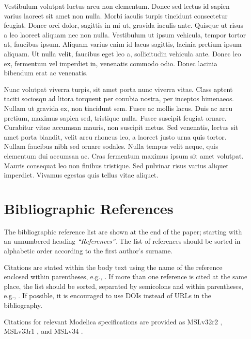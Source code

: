 \documentclass{modelica}
\begin{document}
Vestibulum volutpat luctus arcu non elementum. Donec sed lectus id sapien varius laoreet sit amet non nulla. Morbi iaculis turpis tincidunt consectetur feugiat. Donec orci dolor, sagittis in mi ut, gravida iaculis ante. Quisque ut risus a leo laoreet aliquam nec non nulla. Vestibulum ut ipsum vehicula, tempor tortor at, faucibus ipsum. Aliquam varius enim id lacus sagittis, lacinia pretium ipsum aliquam. Ut nulla velit, faucibus eget leo a, sollicitudin vehicula ante. Donec leo ex, fermentum vel imperdiet in, venenatis commodo odio. Donec lacinia bibendum erat ac venenatis.

Nunc volutpat viverra turpis, sit amet porta nunc viverra vitae. Class aptent taciti sociosqu ad litora torquent per conubia nostra, per inceptos himenaeos. Nullam ut gravida ex, non tincidunt sem. Fusce ac mollis lacus. Duis ac arcu pretium, maximus sapien sed, tristique nulla. Fusce suscipit feugiat ornare. Curabitur vitae accumsan mauris, non suscipit metus. Sed venenatis, lectus sit amet porta blandit, velit arcu rhoncus leo, a laoreet justo urna quis tortor. Nullam faucibus nibh sed ornare sodales. Nulla tempus velit neque, quis elementum dui accumsan ac. Cras fermentum maximus ipsum sit amet volutpat. Mauris consequat leo non finibus tristique. Sed pulvinar risus varius aliquet imperdiet. Vivamus egestas quis tellus vitae aliquet.

\section{Bibliographic References}
The bibliographic reference list are shown at the end of the paper;
starting with an unnumbered heading \emph{``References''}. The list of
references should be sorted in alphabetic order according to the first
author's surname.

Citations are stated within the body text using the name of the
reference enclosed within parentheses, e.g., \cite{Pantelides:1988}. If
more than one reference is cited at the same place, the list should be
sorted, separated by semicolons and within parentheses, e.g.,
\cite{DuffReid:1978,Pierce:2002,Plotkin:1981}. If possible, it is
encouraged to use DOIs instead of URLs in the bibliography.

Citations for relevant Modelica specifications are provided as 
MSLv32r2 \cite{MSLv32r2}, MSLv33r1 \cite{MSLv33r1}, and MSLv34 \cite{MSLv34}.



\end{document}

